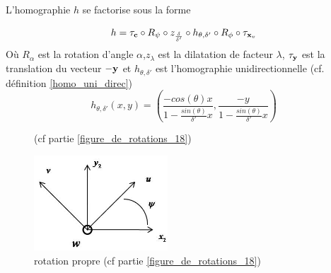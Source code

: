 \begin{prop}
 L'homographie  $h$ se factorise sous la forme
 
\begin{equation}
h = \tau_{\mathbf{c}}   \circ R_{\psi} \circ z_{\frac{\delta}{\delta'}} \circ h_{\theta,\delta'} \circ R_{\phi} \circ \tau_{\mathbf{x}_v}
\label{formul_decomp}
\end{equation}
Où $R_{\alpha}$ est la rotation d'angle $\alpha$,$z_\lambda$ est la dilatation de facteur $\lambda$, $\tau_{\mathbf{y}}$ est  la translation du vecteur $-\mathbf{y}$ et $h_{\theta,\delta'}$ est l'homographie unidirectionnelle (cf. définition \ref{homo_uni_direc})
\begin{equation}
h_{\theta,\delta'}(x,y)=\left(\frac{-cos(\theta)x}{1-\frac{sin(\theta)}{\delta'}x} ,\frac{-y}{1-\frac{sin(\theta)}{\delta'}x}\right)
\label{mise_perspective}
\end{equation}
\label{prop_decomp}
\end{prop}

\begin{figure}[h!]
\centering
{}
\caption{(cf partie \ref{figure_de_rotations_18})}
\label{img_angles}
\end{figure}

\begin{figure}[h!]
\centering
\includegraphics[width=5cm]{graphe3.jpg}
\caption{rotation propre (cf partie \ref{figure_de_rotations_18})}
\label{decompgeo_rotationPropre}
\end{figure}

